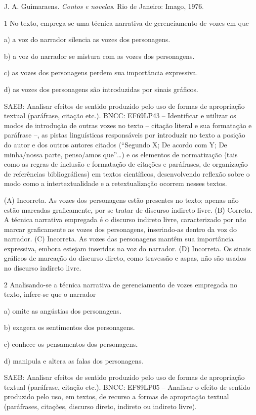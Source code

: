 J. A. Guimaraens. \emph{Contos e novelas}. Rio de Janeiro: Imago, 1976.

\num{1} No texto, emprega-se uma técnica narrativa de gerenciamento de
vozes em que

a) a voz do narrador silencia as vozes dos personagens.

b) a voz do narrador se mistura com as vozes dos personagens.

c) as vozes dos personagens perdem sua importância expressiva.

d) as vozes dos personagens são introduzidas por sinais gráficos.

SAEB: Analisar efeitos de sentido produzido pelo uso de formas de
apropriação textual (paráfrase, citação etc.). BNCC: EF69LP43 --
Identificar e utilizar os modos de introdução de outras vozes no texto
-- citação literal e sua formatação e paráfrase --, as pistas
linguísticas responsáveis por introduzir no texto a posição do autor e
dos outros autores citados (``Segundo X; De acordo com Y; De minha/nossa
parte, penso/amos que''\ldots) e os elementos de normatização (tais como
as regras de inclusão e formatação de citações e paráfrases, de
organização de referências bibliográficas) em textos científicos,
desenvolvendo reflexão sobre o modo como a intertextualidade e a
retextualização ocorrem nesses textos.

(A) Incorreta. As vozes dos personagens estão presentes no texto; apenas
não estão marcadas graficamente, por se tratar de discurso indireto
livre. (B) Correta. A técnica narrativa empregada é o discurso indireto
livre, caracterizado por não marcar graficamente as vozes dos
personagens, inserindo-as dentro da voz do narrador. (C) Incorreta. As
vozes das personagens mantêm sua importância expressiva, embora estejam
inseridas na voz do narrador. (D) Incorreta. Os sinais gráficos de
marcação do discurso direto, como travessão e aspas, não são usados no
discurso indireto livre.

\num{2} Analisando-se a técnica narrativa de gerenciamento de vozes
empregada no texto, infere-se que o narrador

a) omite as angústias dos personagens.

b) exagera os sentimentos dos personagens.

c) conhece os pensamentos dos personagens.

d) manipula e altera as falas dos personagens.

SAEB: Analisar efeitos de sentido produzido pelo uso de formas de
apropriação textual (paráfrase, citação etc.). BNCC: EF89LP05 --
Analisar o efeito de sentido produzido pelo uso, em textos, de recurso a
formas de apropriação textual (paráfrases, citações, discurso direto,
indireto ou indireto livre).

